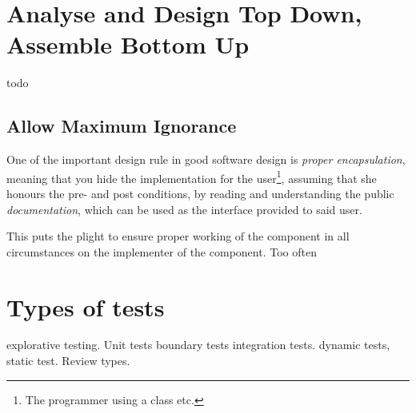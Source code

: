 \documentclass[\docroot/main]{subfiles}
\begin{document}
\section{Analyse and Design Top Down, Assemble Bottom Up}
todo

\subsection{Allow Maximum Ignorance}
One of the important design rule in good software design is \textit{proper
encapsulation}, meaning that you hide the implementation for the
user\footnote{The programmer using a class etc.}, assuming that she
honours the pre- and post conditions, by reading and understanding the
public \textit{documentation}, which can be used as the interface
provided to said user.

This puts the plight to ensure proper working of the component in all
circumstances on the implementer of the component. Too often 

\section{Types of tests}
explorative testing.
Unit tests
boundary tests
integration tests.
dynamic tests, static test.
Review types.
\end{document}
